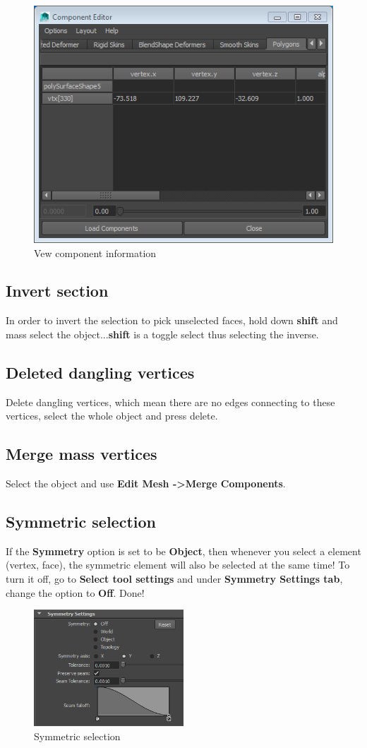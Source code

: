 \begin{figure}[h]
	\centering
	\includegraphics[width=0.5\linewidth]{"figures/View component information"}
	\caption{Vew component information}\label{fig:view component information}
\end{figure}

\subsection{Invert section}
In order to invert the selection to pick unselected faces, hold down \textbf{shift} and mass select the object...\textbf{shift} is a toggle select thus selecting the inverse.

\subsection{Deleted dangling vertices}
Delete dangling vertices, which mean there are no edges connecting to these vertices, select the whole object and press delete.

\subsection{Merge mass vertices}
Select the object and use \textbf{Edit Mesh -\textgreater Merge Components}.

\subsection{Symmetric selection}
If the \textbf{Symmetry} option is set to be \textbf{Object}, then whenever you select a element (vertex, face), the symmetric element will also be selected at the same time! To turn it off, go to \textbf{Select tool settings} and under \textbf{Symmetry Settings tab}, change the option to \textbf{Off}. Done!

\begin{figure}[h]
	\centering
	\includegraphics[width = 0.5\textwidth]{figures/symmetric_selection}
	\caption{Symmetric selection} \label{fig: Symmetric selection}
\end{figure}


